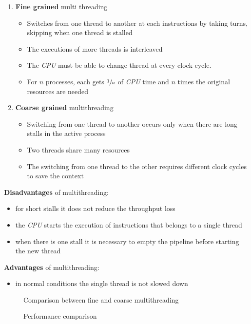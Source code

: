 \documentclass[english]{article}
\begin{document}
\begin{enumerate}
  \item \textbf{Fine grained} multi threading
        \begin{itemize}
          \item Switches from one thread to another at each instructions by taking turns, skipping when one thread is stalled
          \item The executions of more threads is interleaved
          \item The \textit{CPU} must be able to change thread at every clock cycle.
          \item For \(n\) processes, each gets \(\sfrac{1}{n}\) of \textit{CPU} time and \(n\) times the original resources are needed
        \end{itemize}
  \item \textbf{Coarse grained} multithreading
        \begin{itemize}
          \item Switching from one thread to another occurs only when there are long stalls in the active process
          \item Two threads share many resources
          \item The switching from one thread to the other requires different clock cycles to save the context
        \end{itemize}
\end{enumerate}

\textbf{Disadvantages} of multithreading:
\begin{itemize}
  \item for short stalls it does not reduce the throughput loss
  \item the \textit{CPU} starts the execution of instructions that belongs to a single thread
  \item when there is one stall it is necessary to empty the pipeline before starting the new thread
\end{itemize}

\textbf{Advantages} of multithreading:
\begin{itemize}
  \item in normal conditions the single thread is not slowed down
\end{itemize}

\begin{figure}[htbp]
  \bigskip
  \centering
  \begin{minipage}[b]{0.45\textwidth}
    \centering
    \caption{Comparison between fine and coarse multithreading}
    \label{fig:multithreading-comparion}
  \end{minipage}
  \begin{minipage}[b]{0.45\textwidth}
    \centering
    \caption{Performance comparison}
    \label{fig:performance-comparison}
  \end{minipage}
  \bigskip
\end{figure}
\end{document}
